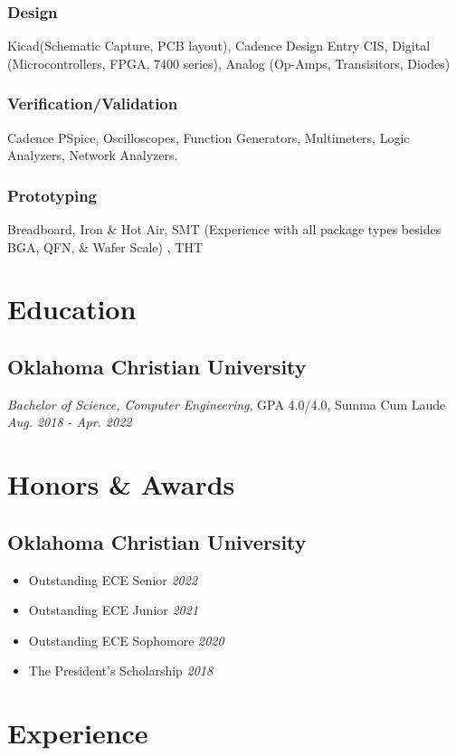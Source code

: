 \documentclass{article}
\begin{document}
\begin{spacing}{.5}
		\subsubsection{Design} \large{Kicad(Schematic Capture, PCB layout), Cadence Design Entry CIS, Digital} \small{(Microcontrollers, FPGA, 7400 series)}\large{, Analog} \small{(Op-Amps, Transisitors, Diodes)}
		\large{\subsubsection{Verification/Validation} Cadence PSpice, Oscilloscopes, Function Generators, Multimeters, Logic Analyzers, Network Analyzers.}
		\subsubsection{Prototyping} \large{Breadboard, Iron \& Hot Air, SMT} \small{(Experience with all package types besides BGA, QFN, \& Wafer Scale)} \large{, THT}

\section{Education}
	\subsection{Oklahoma Christian University}
		\textit{Bachelor of Science, Computer Engineering}, GPA 4.0/4.0, Summa Cum Laude \hfill \small{\textsl{Aug. 2018 - Apr. 2022}}

\section{Honors \& Awards}
	\subsection{Oklahoma Christian University}
		\begin{itemize}[label=$\bullet$,itemsep=-.75ex]
			\item \large{Outstanding ECE Senior} \hfill \small{\textsl{2022}}
			\item \large{Outstanding ECE Junior} \hfill \small{\textsl{2021}}
			\item \large{Outstanding ECE Sophomore} \hfill \small{\textsl{2020}}
			\item \large{The President's Scholarship} \hfill \small{\textsl{2018}}
		\end{itemize}
\section{Experience}

\end{spacing}
\end{document}
